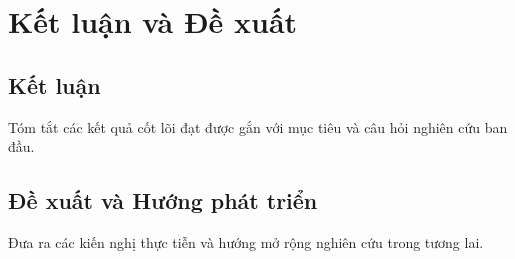 
\chapter{Kết luận và Đề xuất}\label{ch:ket_luan}

\startcontents[chapters]

\section{Kết luận}\label{sec:ch05_ket_luan}

Tóm tắt các kết quả cốt lõi đạt được gắn với mục tiêu và câu hỏi nghiên cứu ban đầu.

\section{Đề xuất và Hướng phát triển}\label{sec:ch05_de_xuat}

Đưa ra các kiến nghị thực tiễn và hướng mở rộng nghiên cứu trong tương lai.

